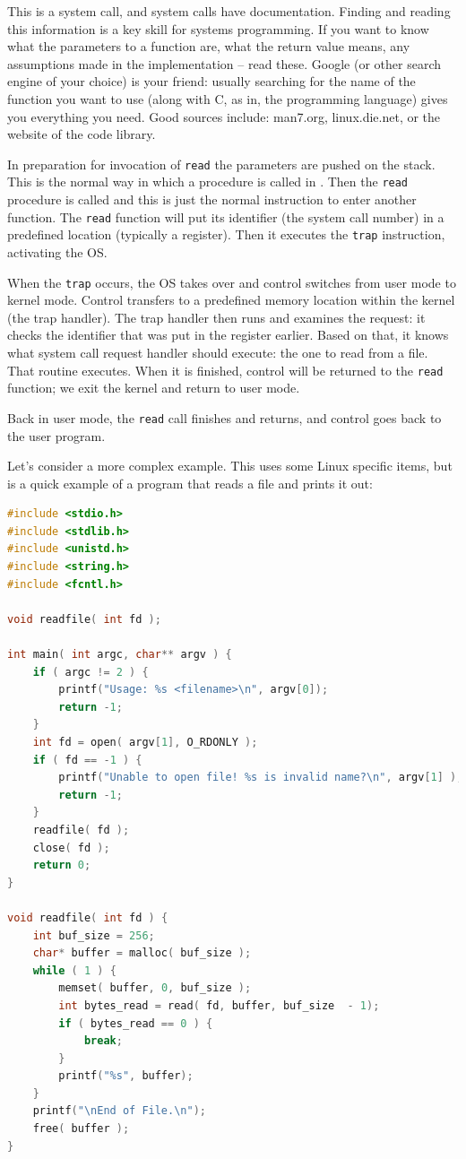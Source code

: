 This is a system call, and system calls have documentation. Finding and reading this information is a key skill for systems programming. If you want to know what the parameters to a function are, what the return value means, any assumptions made in the implementation -- read these. Google (or other search engine of your choice) is your friend: usually searching for the name of the function you want to use (along with C, as in, the programming language) gives you everything you need.  Good sources include: man7.org, linux.die.net, or the website of the code library.



In preparation for invocation of \texttt{read} the parameters are pushed on the stack. This is the normal way in which a procedure is called in \Cpp. Then the \texttt{read} procedure is called and this is just the normal instruction to enter another function. The \texttt{read} function will put its identifier (the system call number) in a predefined location (typically a register). Then it executes the \texttt{trap} instruction, activating the OS.

When the \texttt{trap} occurs, the OS takes over and control switches from user mode to kernel mode. Control transfers to a predefined memory location within the kernel (the trap handler). The trap handler then runs and examines the request: it checks the identifier that was put in the register earlier. Based on that, it knows what system call request handler should execute: the one to read from a file. That routine executes. When it is finished, control will be returned to the \texttt{read} function; we exit the kernel and return to user mode.

Back in user mode, the \texttt{read} call finishes and returns, and control goes back to the user program.

Let's consider a more complex example. This uses some Linux specific items, but is a quick example of a program that reads a file and prints it out:

\begin{lstlisting}[language=C]
#include <stdio.h>
#include <stdlib.h>
#include <unistd.h>
#include <string.h>
#include <fcntl.h>

void readfile( int fd );

int main( int argc, char** argv ) {
    if ( argc != 2 ) {
        printf("Usage: %s <filename>\n", argv[0]);
        return -1;
    }
    int fd = open( argv[1], O_RDONLY );
    if ( fd == -1 ) {
        printf("Unable to open file! %s is invalid name?\n", argv[1] );
        return -1;
    }
    readfile( fd );
    close( fd );
    return 0;
}

void readfile( int fd ) {
    int buf_size = 256;
    char* buffer = malloc( buf_size );
    while ( 1 ) {
        memset( buffer, 0, buf_size );
        int bytes_read = read( fd, buffer, buf_size  - 1);  
        if ( bytes_read == 0 ) {
            break; 
        }     
        printf("%s", buffer);
    }
    printf("\nEnd of File.\n");
    free( buffer );
}
\end{lstlisting}


